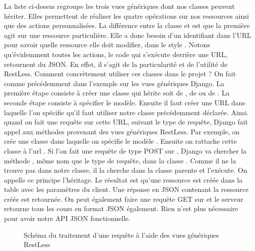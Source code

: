 \documentclass[a4paper,10pt,twoside]{sphinxmanual}
\begin{document}
La liste ci-dessus regroupe les trois vues génériques dont nos classes peuvent hériter. Elles permettent de réaliser les quatre opérations sur nos ressources ainsi que des actions personnalisées. La différence entre la classe  et  est que la première agit sur une ressource particulière. Elle a donc besoin d'un identifiant dans l'URL pour savoir quelle ressource elle doit modifier, dans le style . Notons qu'évidemment toutes les actions, le code qui s'exécute derrière une URL, retournent du JSON. En effet, il s'agit de la particularité et de l'utilité de RestLess. Comment concrètement utiliser ces classes dans le projet ? On fait comme précédemment dans l'exemple sur les vues génériques Django. La première étape consiste à créer une classe qui hérite soit de , de  ou de . La seconde étape consiste à spécifier le modèle. Ensuite il faut créer une URL dans laquelle l'on spécifie qu'il faut utiliser notre classe précédemment déclarée. Ainsi. quand on fait une requête sur cette URL, suivant le type de requête, Django fait appel aux méthodes provenant des vues génériques RestLess. Par exemple, on crée une classe  dans laquelle on spécifie le modèle . Ensuite on rattache cette classe à l'url . Si l'on fait une requête de type POST sur , Django va chercher la méthode , même nom que le type de requête, dans la classe . Comme il ne la trouve pas dans notre classe, il la cherche dans la classe parente  et l'exécute. On appelle ce principe l'héritage. Le résultat est qu'une ressource est créée dans la table  avec les paramètres du client. Une réponse en JSON contenant la ressource créée est retournée. On peut également faire une requête GET sur  et le serveur retourne tous les cours en format JSON également. Rien n'est plus nécessaire pour avoir notre API JSON fonctionnelle.
\begin{figure}[htbp]
\centering
\capstart

\caption{Schéma du traitement d'une requête à l'aide des vues génériques RestLess}\end{figure}
\end{document}
